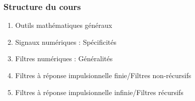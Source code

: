 \documentclass{beamer}
\begin{document}
\begin{frame} 
\frametitle{Structure du cours}
\begin{enumerate}
\item Outils mathématiques généraux  
\item Signaux numériques : Spécificités 
\item Filtres numériques : Généralités 
\item Filtres à réponse impulsionnelle finie/Filtres non-récursifs 
\item Filtres à réponse impulsionnelle infinie/Filtres récursifs 
\end{enumerate}
\end{frame} 
\end{document}
